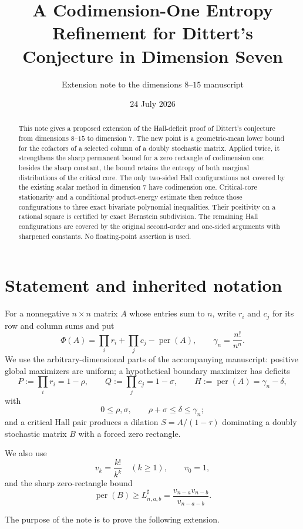 \documentclass[11pt]{article}
\title{A Codimension-One Entropy Refinement for Dittert's Conjecture in Dimension Seven}
\author{Extension note to the dimensions $8$--$15$ manuscript}
\date{24 July 2026}
\theoremstyle{definition}
\newcommand{\per}{\operatorname{per}}
\begin{document}
\maketitle

\begin{abstract}
This note gives a proposed extension of the Hall-deficit proof of Dittert's conjecture from dimensions $8$--$15$ to dimension $7$.  The new point is a geometric-mean lower bound for the cofactors of a selected column of a doubly stochastic matrix.  Applied twice, it strengthens the sharp permanent bound for a zero rectangle of codimension one: besides the sharp constant, the bound retains the entropy of both marginal distributions of the critical core.  The only two-sided Hall configurations not covered by the existing scalar method in dimension $7$ have codimension one.  Critical-core stationarity and a conditional product-energy estimate then reduce those configurations to three exact bivariate polynomial inequalities.  Their positivity on a rational square is certified by exact Bernstein subdivision.  The remaining Hall configurations are covered by the original second-order and one-sided arguments with sharpened constants.  No floating-point assertion is used.
\end{abstract}

\section{Statement and inherited notation}

For a nonnegative $n\times n$ matrix $A$ whose entries sum to $n$, write $r_i$ and $c_j$ for its row and column sums and put
\[
 \Phi(A)=\prod_i r_i+\prod_jc_j-\per(A),
 \qquad
 \gamma_n=\frac{n!}{n^n}.
\]
We use the arbitrary-dimensional parts of the accompanying manuscript: positive global maximizers are uniform; a hypothetical boundary maximizer has deficits
\[
 P:=\prod_i r_i=1-\rho,
 \qquad Q:=\prod_jc_j=1-\sigma,
 \qquad H:=\per(A)=\gamma_n-\delta,
\]
with
\[
 0\le \rho,\sigma,
 \qquad \rho+\sigma\le\delta\le\gamma_n;
 \tag{1.1}\label{eq:budget}
\]
and a critical Hall pair produces a dilation $S=A/(1-\tau)$ dominating a doubly stochastic matrix $B$ with a forced zero rectangle.

We also use
\[
 v_k=\frac{k!}{k^k}\quad(k\ge1),\qquad v_0=1,
\]
and the sharp zero-rectangle bound
\[
 \per(B)\ge L^{\sharp}_{n,a,b}
 =\frac{v_{n-a}v_{n-b}}{v_{n-a-b}}.
 \tag{1.2}\label{eq:sharp}
\]

The purpose of the note is to prove the following extension.
\end{document}
